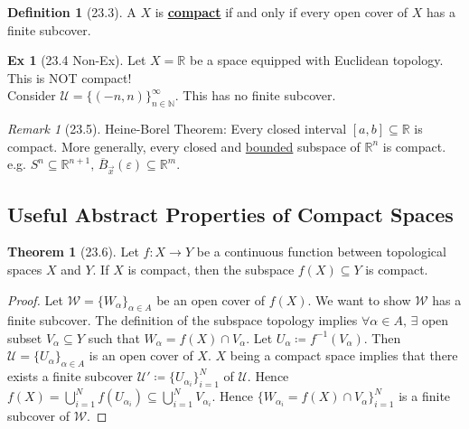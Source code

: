\documentclass{article}
\newcommand{\R}{\ensuremath{\mathbb{R}}}
\newcommand{\N}{\ensuremath{\mathbb{N}}}
\newcommand{\Iff}{if and only if}
\newcommand{\script}[1]{\ensuremath{\mathscr{#1}}}
\newcommand{\coleq}{\ensuremath{\coloneqq}}
\newcommand{\define}[1]{\textbf{\underline{#1}}}
\newcommand{\func}[3]{\ensuremath{#1: #2 \to #3}}
\newcommand{\Ball}[3]{\ensuremath{\overline{B}_{#1}^{#2}(#3)}}
\newcommand{\Ts}[2]{\ensuremath{(#1,#2)}}
\newcommand{\Union}{\bigcup}
\newcommand{\inter}{\cap}
\renewcommand{\Subset}{\subseteq}
\theoremstyle{definition}
\newtheorem*{defn}{Definition}
\newtheorem*{thm}{Theorem}
\newtheorem*{ex}{Ex}
\theoremstyle{remark}
\newtheorem*{rmk}{Remark}
\begin{document}
{{            \begin{defn}[23.3]
                A \Ts{} $X$ is \define{compact} \Iff{} every open cover of $X$ has a finite subcover.
            \end{defn}
        
            \begin{ex}[23.4 Non-Ex]
                Let $X=\R$ be a space equipped with Euclidean topology. This is NOT compact!\\
                Consider $\script{U}=\{(-n,n)\}_{n\in \N}^\infty$. This has no finite subcover.
            \end{ex}
        
            \begin{rmk}[23.5]
                Heine-Borel Theorem: Every closed interval $[a,b] \Subset \R$ is compact. More generally, every closed and \underline{bounded} subspace of $\R^n$ is compact. e.g. $S^n \Subset \R^{n+1}, \, \Ball{\Vec{x}}{}{\varepsilon} \Subset \R^m$.
            \end{rmk}
        }
    
        \subsection*{Useful Abstract Properties of Compact Spaces}{
            \begin{thm}[23.6]
                Let $\func{f}{X}{Y}$ be a continuous function between topological spaces $X$ and $Y$. If $X$ is compact, then the subspace $f(X) \Subset Y$ is compact.
            \end{thm}
            
            \begin{proof}
                Let $\script{W}=\{W_\alpha\}_{\alpha \in A}$ be an open cover of $f(X)$. We want to show $\script{W}$ has a finite subcover. The definition of the subspace topology implies $\forall \alpha \in A, \, \exists$ open subset $V_\alpha \Subset Y$ such that $W_\alpha=f(X) \inter V_\alpha$. Let $U_\alpha \coleq f^{-1}(V_\alpha)$. Then $\script{U}=\{U_\alpha\}_{\alpha\in A}$ is an open cover of $X$. $X$ being a compact space implies that there exists a finite subcover $\script{U'}\coleq\{U_{\alpha_i}\}_{i=1}^N$ of $\script{U}$. Hence $f(X)=\Union_{i=1}^N f(U_{\alpha_i}) \Subset \Union_{i=1}^N V_{\alpha_i}$. Hence $\{W_{\alpha_i}=f(X)\inter V_\alpha\}_{i=1}^N$ is a finite subcover of $\script{W}$.
            \end{proof}
            
}}
\end{document}
